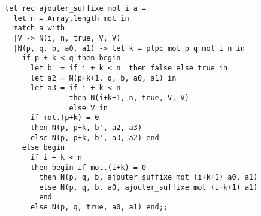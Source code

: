 \begin{Exercise}
\end{Exercise} 
\newpage
\begin{Exercise}
\begin{lstlisting}
let rec ajouter_suffixe mot i a =
  let n = Array.length mot in
  match a with
  |V -> N(i, n, true, V, V)
  |N(p, q, b, a0, a1) -> let k = plpc mot p q mot i n in
    if p + k < q then begin
      let b' = if i + k < n  then false else true in
      let a2 = N(p+k+1, q, b, a0, a1) in
      let a3 = if i + k < n  
               then N(i+k+1, n, true, V, V) 
               else V in
      if mot.(p+k) = 0 
      then N(p, p+k, b', a2, a3) 
      else N(p, p+k, b', a3, a2) end
    else begin
      if i + k < n
      then begin if mot.(i+k) = 0
        then N(p, q, b, ajouter_suffixe mot (i+k+1) a0, a1)
        else N(p, q, b, a0, ajouter_suffixe mot (i+k+1) a1) 
        end
      else N(p, q, true, a0, a1) end;;
\end{lstlisting}
\end{Exercise} 
